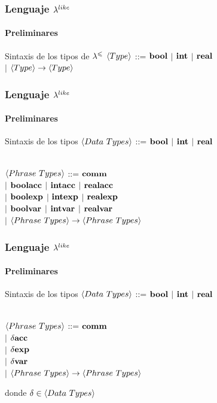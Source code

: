 \documentclass{beamer}
\begin{document}
\begin{frame}
\frametitle{Lenguaje $\lambda^{like}$}
\framesubtitle{Preliminares}

\begin{block}{Sintaxis de los tipos de $\lambda^{\leqslant}$}
$\langle Type \rangle$ ::= $\textbf{bool}$ $|$ $\textbf{int}$ $|$ $\textbf{real}$\\
\quad \quad \quad \quad
$|$ $\langle Type \rangle \rightarrow \langle Type \rangle$\\
\end{block}

\end{frame}

\begin{frame}
\frametitle{Lenguaje $\lambda^{like}$}
\framesubtitle{Preliminares}

\begin{block}{Sintaxis de los tipos}
$\langle Data \ Types \rangle$ ::= $\textbf{bool}$ $|$ $\textbf{int}$ $|$ $\textbf{real}$\\

\

\pause

$\langle Phrase \ Types \rangle$ ::= $\textbf{comm}$\\
\quad \quad \quad \quad \quad 
\quad \quad \quad
$|$ $\textbf{boolacc}$ $|$ $\textbf{intacc}$ $|$ $\textbf{realacc}$\\
\quad \quad \quad \quad \quad 
\quad \quad \quad
$|$ $\textbf{boolexp}$ $|$ $\textbf{intexp}$ $|$ $\textbf{realexp}$\\
\quad \quad \quad \quad \quad 
\quad \quad \quad
$|$ $\textbf{boolvar}$ $|$ $\textbf{intvar}$ $|$ $\textbf{realvar}$\\
\quad \quad \quad \quad \quad 
\quad \quad \quad
$|$ $\langle Phrase \ Types \rangle \rightarrow \langle Phrase \ Types \rangle$
\end{block}
\end{frame}

\begin{frame}
\frametitle{Lenguaje $\lambda^{like}$}
\framesubtitle{Preliminares}

\begin{block}{Sintaxis de los tipos}
$\langle Data \ Types \rangle$ ::= $\textbf{bool}$ $|$ $\textbf{int}$ $|$ $\textbf{real}$\\

\

$\langle Phrase \ Types \rangle$ ::= $\textbf{comm}$\\
\quad \quad \quad \quad \quad 
\quad \quad \quad
$|$ $\delta \textbf{acc}$\\
\quad \quad \quad \quad \quad 
\quad \quad \quad
$|$ $\delta \textbf{exp}$ \\
\quad \quad \quad \quad \quad 
\quad \quad \quad
$|$ $\delta \textbf{var}$\\
\quad \quad \quad \quad \quad 
\quad \quad \quad
$|$ $\langle Phrase \ Types \rangle \rightarrow \langle Phrase \ Types \rangle$
\end{block}

donde $\delta \in \lrangles{Data \ Types}$

\end{frame}
\end{document}
